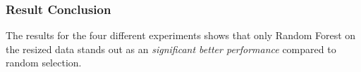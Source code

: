 \subsubsection{Result Conclusion}
The results for the four different experiments shows that only Random Forest on the resized data stands out as an \emph{significant better performance} compared to random selection.

\label{subsec:evaluation}
